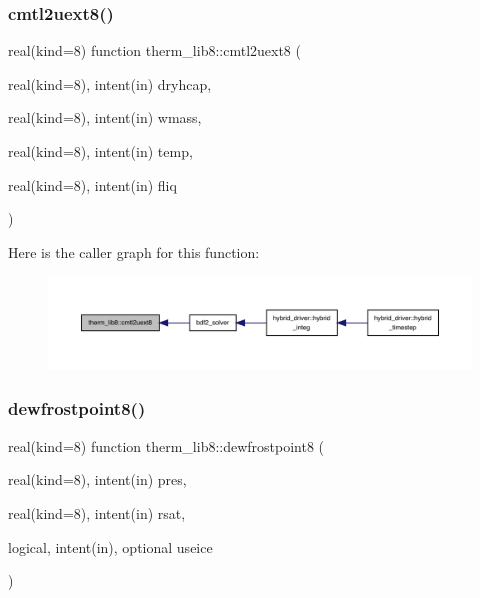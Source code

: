 \subsubsection{\texorpdfstring{cmtl2uext8()}{cmtl2uext8()}}
{\footnotesize\ttfamily real(kind=8) function therm\+\_\+lib8\+::cmtl2uext8 (\begin{DoxyParamCaption}\item[{real(kind=8), intent(in)}]{dryhcap,  }\item[{real(kind=8), intent(in)}]{wmass,  }\item[{real(kind=8), intent(in)}]{temp,  }\item[{real(kind=8), intent(in)}]{fliq }\end{DoxyParamCaption})}

Here is the caller graph for this function\+:
\nopagebreak
\begin{figure}[H]
\begin{center}
\leavevmode
\includegraphics[width=350pt]{namespacetherm__lib8_af5c7259346e1ee029458410d49100d77_icgraph}
\end{center}
\end{figure}
\mbox{\label{namespacetherm__lib8_a028fa9eb09650fbaa2b7c0b6b8a2fd8c}} 
\subsubsection{\texorpdfstring{dewfrostpoint8()}{dewfrostpoint8()}}
{\footnotesize\ttfamily real(kind=8) function therm\+\_\+lib8\+::dewfrostpoint8 (\begin{DoxyParamCaption}\item[{real(kind=8), intent(in)}]{pres,  }\item[{real(kind=8), intent(in)}]{rsat,  }\item[{logical, intent(in), optional}]{useice }\end{DoxyParamCaption})}

